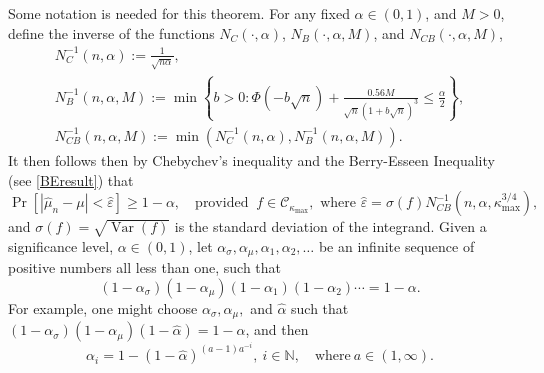 \documentclass[graybox]{svmult}
\newcommand{\Prob}{\Pr}
\newcommand{\abs}[1]{\left|#1\right|}
\DeclareMathOperator{\var}{Var}
\newcommand{\hmu}{\hat{\mu}}
\newcommand{\naturals}{\mathbb{N}}
\newcommand{\halpha}{\hat{\alpha}}
\newcommand{\hvareps}{\hat{\varepsilon}}
\newcommand{\cc}{\mathcal{C}}
\def\abs#1{\ensuremath{\left \lvert #1 \right \rvert}}
\begin{document}
Some notation is needed for this theorem.  For any fixed $\alpha \in (0,1)$, and $M>0$, define the inverse of the functions $N_C(\cdot,\alpha)$, $N_B(\cdot,\alpha,M)$, and $N_{CB}(\cdot,\alpha,M)$,
\begin{gather*}\label{NCinv}
N_C^{-1}(n,\alpha) := \frac{1}{\sqrt{n \alpha}}, \\
\label{NBinv*}
N_B^{-1}(n,\alpha,M) := \min \left \{ b>0 : \Phi\left(-b \sqrt{n}  \right)+\frac{0.56M}{\sqrt{n}\left(1+ b\sqrt{n} \right)^{3}}
\le \frac{\alpha}{2} \right \}, \\
\label{NCBinv*}
N_{CB}^{-1}(n,\alpha,M) := \min(N_C^{-1}(n,\alpha),N_B^{-1}(n,\alpha,M)).
\end{gather*}
It then follows then by Chebychev's inequality and the Berry-Esseen Inequality (see \eqref{BEresult}) that 
\begin{equation*}
\Prob[\abs{\hmu_n -\mu}<\hvareps] \geq 1-\alpha, \quad \text{provided } \ f \in \cc_{\kappa_{\max}}, \text{ where }\hvareps=\sigma(f) N_{CB}^{-1}(n,\alpha,\kappa_{\max}^{3/4}), 
\end{equation*} 
and $\sigma(f)=\sqrt{\var(f)}$ is the standard deviation of the integrand.  Given a significance level, $\alpha \in (0,1)$, let $\alpha_{\sigma}, \alpha_{\mu}, \alpha_1,  \alpha_2, \ldots$ be an infinite sequence of positive numbers all less than one, such that 
\begin{equation} \label{alphaseq}
(1-\alpha_{\sigma})(1-\alpha_{\mu})(1-\alpha_1)(1-\alpha_2) \cdots = 1-\alpha.
\end{equation}
For example, one might choose $\alpha_{\sigma},\alpha_{\mu},$ and $\halpha$ such that $(1-\alpha_{\sigma})(1-\alpha_{\mu})(1-\halpha)=1-\alpha$, and then 
\begin{equation} \label{alphaseqex}
\alpha_{i} = 1-(1-\halpha)^{(a-1)a^{-i}}, \ i\in \naturals, \quad \text{where} \  a \in (1,\infty).
\end{equation}
\end{document}
